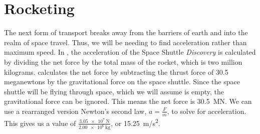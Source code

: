 \section{Rocketing}
	The next form of transport breaks away from the barriers of earth and into the realm of space travel. Thus, we will be needing to find acceleration rather than maximum speed. In \cite {rocketAcceleration}, the acceleration of the Space Shuttle \textit{Discovery} is calculated by dividing the net force by the total mass of the rocket, which is two million kilograms. \cite{rocketAcceleration} calculates the net force by subtracting the thrust force of 30.5 meganewtons by the gravitational force on the space shuttle. Since the space shuttle will be flying through space, which we will assume is empty, the gravitational force can be ignored. This means the net force is \SI{30.5}{\MN}. We can use a rearranged version Newton's second law, $a = \frac{F}{m}$, to solve for acceleration. This gives us a value of $\frac{\SI{3.05e7}{\newton}}{\SI{2.00e6}{\kg}}$, or \SI{15.25}{\metre/\second^2}.
